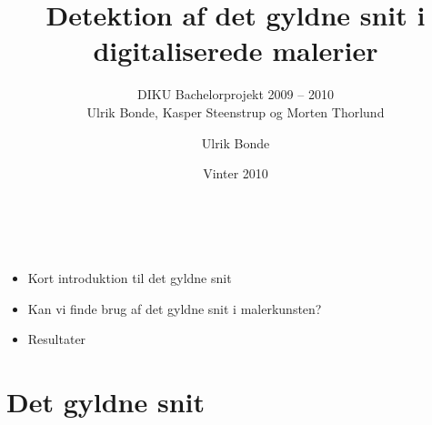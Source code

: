 \documentclass[xcolor=table]{beamer}
\title{\huge{Detektion af det gyldne snit i digitaliserede malerier}}
\subtitle{DIKU Bachelorprojekt 2009 -- 2010\\{\tiny Ulrik Bonde, Kasper Steenstrup og Morten Thorlund}}
\author{Ulrik Bonde}
\date{Vinter 2010}
\begin{document}
\begin{frame}
    \titlepage
\end{frame}

\section[Oversigt]{}
\begin{frame}

    \frametitle{\ }

    \begin{itemize}
        \item Kort introduktion til det gyldne snit
        \item Kan vi finde brug af det gyldne snit i malerkunsten?
        \item Resultater
    \end{itemize}

\end{frame}

\section{Det gyldne snit}
\subsection*{}
\end{document}
